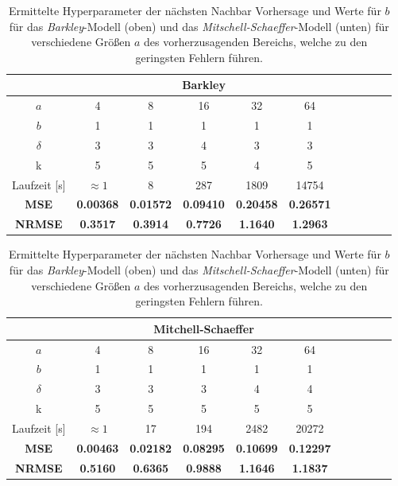 \begin{table}[h]
	\centering

	\begin{tabular}{ccccccccccc}
		\hline		
		\multicolumn{1}{c}{} & \multicolumn{5}{c}{Barkley}\\ 
		\hline 
		\rule[-1ex]{0pt}{2.5ex} $a$ & 4 & 8 & 16 & 32 & 64\\ 
		\rule[-1ex]{0pt}{2.5ex} $b$ & 1 & 1 & 1  & 1  & 1 \\ 
		\rule[-1ex]{0pt}{2.5ex} $\delta$ & 3 & 3 & 4 & 3 & 3 \\ 
		\rule[-1ex]{0pt}{2.5ex} k & 5 & 5 & 5 & 4 & 5 \\ 
		\rule[-1ex]{0pt}{2.5ex} Laufzeit [s] & $\approx 1$ & 8 & 287 & 1809 & 14754\\ 
		\rule[-1ex]{0pt}{2.5ex} \textbf{MSE} & \textbf{0.00368} & \textbf{0.01572} & \textbf{0.09410} & \textbf{0.20458} & \textbf{0.26571}\\ 
		\rule[-1ex]{0pt}{2.5ex} \textbf{NRMSE} & \textbf{0.3517} & \textbf{0.3914} & \textbf{0.7726} & \textbf{1.1640} & \textbf{1.2963} \\ 
		\hline 
	\end{tabular} 
	
	\vspace{0.75cm}

	\centering

	\begin{tabular}{ccccccccccc}
		\hline
		\multicolumn{1}{c}{} & \multicolumn{5}{c}{Mitchell-Schaeffer} \\ 
		\hline 
		\rule[-1ex]{0pt}{2.5ex} $a$ & 4 & 8 & 16 & 32 & 64 \\ 
		\rule[-1ex]{0pt}{2.5ex} $b$ & 1 & 1 & 1  & 1  & 1\\ 
		\rule[-1ex]{0pt}{2.5ex} $\delta$ & 3 & 3 & 3 & 4 & 4 \\ 
		\rule[-1ex]{0pt}{2.5ex} k & 5 & 5 & 5 & 5 & 5 \\ 
		\rule[-1ex]{0pt}{2.5ex} Laufzeit [s] & $\approx 1$ & 17 & 194 & 2482 & 20272\\ 
		\rule[-1ex]{0pt}{2.5ex} \textbf{MSE} & \textbf{0.00463} & \textbf{0.02182} & \textbf{0.08295} & \textbf{0.10699} & \textbf{0.12297} \\ 
		\rule[-1ex]{0pt}{2.5ex} \textbf{NRMSE} & \textbf{0.5160} & \textbf{0.6365} & \textbf{0.9888} & \textbf{1.1646} & \textbf{1.1837} \\ 
		\hline 
	\end{tabular} 

	\caption{Ermittelte Hyperparameter der nächsten Nachbar Vorhersage und Werte für $b$ für das \textit{Barkley}-Modell (oben) und das \textit{Mitschell-Schaeffer}-Modell (unten) für verschiedene Größen $a$ des vorherzusagenden Bereichs, welche zu den geringsten Fehlern führen.}
\label{tab:exp_inner_cross_nn_results}
\end{table}


